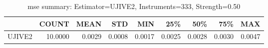 \begin{table}[ht]
\centering
\caption{mse summary: Estimator=UJIVE2, Instruments=333, Strength=0.50}
\begin{tabular}{lrrrrrrrr}
\toprule
 & COUNT & MEAN & STD & MIN & 25\% & 50\% & 75\% & MAX \\
\midrule
UJIVE2 & 10.0000 & 0.0029 & 0.0008 & 0.0017 & 0.0025 & 0.0028 & 0.0030 & 0.0047 \\
\bottomrule
\end{tabular}
\end{table}
